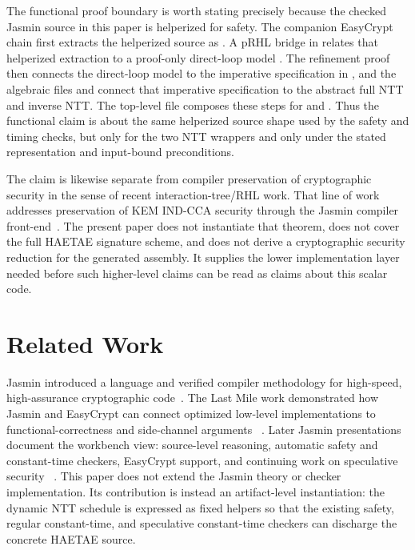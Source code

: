 \documentclass[10pt,twocolumn]{article}
\newcommand{\haetae}{HAETAE}
\newcommand{\jasmin}{Jasmin}
\newcommand{\ct}{constant-time}
\begin{document}
The functional proof boundary is worth stating precisely because the checked
\jasmin{} source in this paper is helperized for safety.  The companion
EasyCrypt chain first extracts the helperized source as .
A pRHL bridge in  relates that helperized extraction to a
proof-only direct-loop model .  The refinement proof then
connects the direct-loop model to the imperative specification in
, and the algebraic files  and
 connect that imperative specification to the abstract
full NTT and inverse NTT.  The top-level file  composes
these steps for  and .  Thus the
functional claim is about the same helperized source shape used by the safety
and timing checks, but only for the two NTT wrappers and only under the stated
representation and input-bound preconditions.

The claim is likewise separate from compiler preservation of cryptographic
security in the sense of recent interaction-tree/RHL work.  That line of work
addresses preservation of KEM IND-CCA security through the \jasmin{} compiler
front-end~\cite{ArranzOlmos2025JasminSecurity}.  The present paper does not
instantiate that theorem, does not cover the full \haetae{} signature scheme,
and does not derive a cryptographic security reduction for the generated
assembly.  It supplies the lower implementation layer needed before such
higher-level claims can be read as claims about this scalar code.

\section{Related Work}

\jasmin{} introduced a language and verified compiler methodology for
high-speed, high-assurance cryptographic code~\cite{Jasmin2017}.  The Last Mile
work demonstrated how \jasmin{} and EasyCrypt can connect optimized low-level
implementations to functional-correctness and side-channel arguments
~\cite{LastMile2020}.  Later \jasmin{} presentations document the workbench
view: source-level reasoning, automatic safety and \ct{} checkers, EasyCrypt
support, and continuing work on speculative security
~\cite{JasminWorkshop2021,JasminWorkbench2023,JasminCourse2024,JasminFramework2026}.
This paper does not extend the \jasmin{} theory or checker implementation.  Its
contribution is instead an artifact-level instantiation: the dynamic NTT
schedule is expressed as fixed helpers so that the existing safety, regular
\ct{}, and speculative \ct{} checkers can discharge the concrete HAETAE source.
\end{document}
